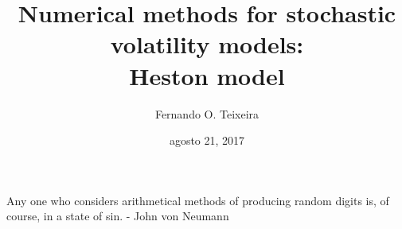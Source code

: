 \documentclass[12pt,twoside]{reedthesis}
\title{\textbf{\Huge{Numerical methods for stochastic volatility models: \\[20pt] Heston model}}}
\author{Fernando O. Teixeira}
\date{agosto 21, 2017}
\theoremstyle{definition}
\theoremstyle{definition}
\theoremstyle{remark}
\begin{document}
      \maketitle
  
  \frontmatter %
  \pagestyle{empty} %
      \begin{acknowledgements}
      Any one who considers arithmetical methods of producing random digits
      is, of course, in a state of sin. - John von Neumann
      \textbf{\\ \\ \\ \\ \\ \\ \\ \\ \\ \\ \\ \\ \\ \\ \\ \\ \\ \\ \\ \\ \\ \\ \\ \\ \\ \\ \\ \\ \\ \\ \\ \\ \\ \\ \\ \\ \\ \\ \\ \\ \\ \\ \\ \\ \\ \\ \\ \\ \\ \\ \\ \\ \\ \\ \\ \\ \\ \\ \\ \\ \\ \\ \\ }

\end{acknowledgements}
\end{document}
